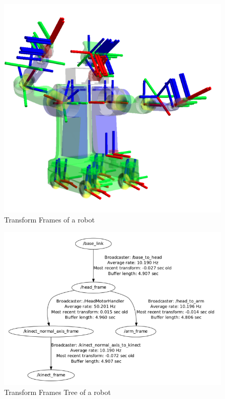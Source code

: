 \begin{figure}[H]
    \centering
    \includegraphics[scale = 0.5]{Images/Chapter 2/robottf.png}
    \caption{Transform Frames of a robot}
    \label{fig:robottf}
\end{figure}

\begin{figure}[H]
    \centering
    \includegraphics[scale = 0.5]{Images/Chapter 2/robottftree.png}
    \caption{Transform Frames Tree of a robot}
    \label{fig:robottf}
\end{figure}
